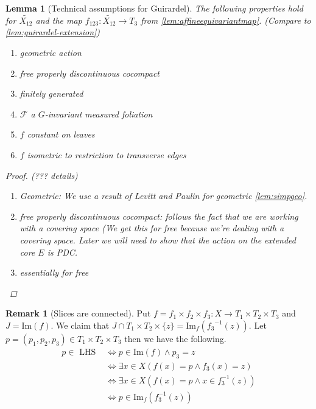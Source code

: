 \documentclass[12pt,parskip=full]{report}
\theoremstyle{plain}
\newtheorem{lem}[thm]{Lemma}
\theoremstyle{definition}
\newtheorem{rmk}[thm]{Remark}
\begin{document}
\begin{lem}
[Technical assumptions for Guirardel]
    \label{lem:technicalconditions}
 The following properties hold for \(\widetilde{ X_{12} }\) and the map \(f_{123}: \widetilde{ X_{12}}\to T_3\) from \ref{lem:affineequivariantmap}. (Compare to \ref{lem:guirardel-extension})
    \begin{enumerate}
        \item geometric action
        \item free properly discontinuous cocompact
        \item finitely generated
        \item \(\mathscr{F}\) a \(G\)-invariant measured foliation
        \item \(f\) constant on leaves
        \item \(f\) isometric to restriction to transverse edges
        
    \end{enumerate}
    
    \begin{proof}
    (??? details)
    \begin{enumerate}
        \item Geometric: We use a result of Levitt and Paulin for geometric \ref{lem:simpgeo}.
        \item free properly discontinuous cocompact: follows the fact that we are working with a covering space (We get this for free because we're dealing with a covering space. Later we will need to show that the action on the extended core $E$ is PDC.
        \item essentially for free
    \end{enumerate}
    \end{proof}
\end{lem}

\begin{rmk}
    [Slices are connected]
 \label{lem:fibershomeoplanes} 
    Put \(f =  f_{1} \times f_{2} \times f_{3}: X \to T_{1} \times T_{2} \times T_{3} \) and \(J = \text{Im}(f)\). We claim that \(J \cap T_{1} \times T_{2} \times \{z\} = \text{Im}_{f} ({ f_{3}}^{-1}(z))\). Let \(p = (p_{1}, p_{2} , p_{3}) \in T_{1} \times T_{2} \times T_{3}\) then we have the following. 
    \begin{align*}
        p \in \text { LHS } & \Longleftrightarrow p \in \text{Im}(f) \wedge p_{3} = z \\ 
        & \Longleftrightarrow \exists x \in X (f(x)=p \wedge  f_3(x)=z)\\
        & \Longleftrightarrow \exists x \in X (f(x)=p \wedge x \in f_3^{-1} (z))\\
        & \Longleftrightarrow p \in \text{Im}_f(f_3^{-1} (z))
    \end{align*}
\end{rmk}
\end{document}
